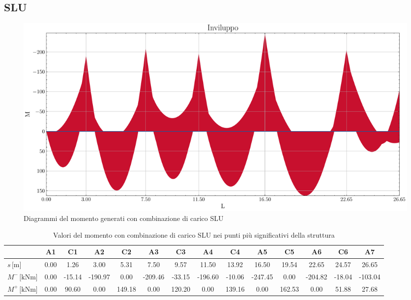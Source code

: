 \begin{landscape}
\subsection{SLU}
\begin{figure}[H]
\centering
\includegraphics[height=0.6\textwidth]{IMG/diagrammi_trave/ULS_M.pdf}
\caption{Diagrammi del momento generati con combinazione di carico SLU}
\label{fig:trave_ULS_momento}
\end{figure}
\begin{table}[H]
\footnotesize
\centering
\caption{Valori del momento con combinazione di carico SLU nei punti più significativi della struttura}
\label{tab:trave_ULS_momento}
	\begin{tabular}{lS[table-format=-3.2]S[table-format=-3.2]S[table-format=-3.2]S[table-format=-3.2]S[table-format=-3.2]S[table-format=-3.2]S[table-format=-3.2]S[table-format=-3.2]S[table-format=-3.2]S[table-format=-3.2]S[table-format=-3.2]S[table-format=-3.2]S[table-format=-3.2]}
		\toprule
		{} & {A1} & {C1} & {A2} & {C2} & {A3} & {C3} & {A4} & {C4} & {A5} & {C5} & {A6} & {C6} & {A7} \\
		\midrule
		$s\,\si{[\metre]}$ & 0.00 & 1.26 & 3.00 & 5.31 & 7.50 & 9.57 & 11.50 & 13.92 & 16.50 & 19.54 & 22.65 & 24.57 & 26.65 \\
        $M^{-}\,\si{[\kilo\newton\metre]}$ & 0.00 & -15.14 & -190.97 & 0.00 & -209.46 & -33.15 & -196.60 & -10.06 & -247.45 & 0.00 & -204.82 & -18.04 & -103.04 \\
        $M^{+}\,\si{[\kilo\newton\metre]}$ & 0.00 & 90.60 & 0.00 & 149.18 & 0.00 & 120.20 & 0.00 & 139.16 & 0.00 & 162.53 & 0.00 & 51.88 & 27.68 \\
		\bottomrule
	\end{tabular}

\end{table}
\end{landscape}
